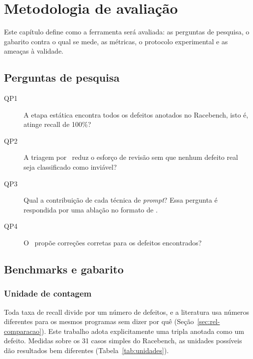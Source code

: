\chapter{Metodologia de avaliação}
\label{cap:metodologia}


Este capítulo define como a ferramenta será avaliada: as perguntas de pesquisa,
o gabarito contra o qual se mede, as métricas, o protocolo experimental e as
ameaças à validade.

\section{Perguntas de pesquisa}
\label{sec:qp}

\begin{description}
  \item[QP1] A etapa estática encontra todos os defeitos anotados no Racebench,
    isto é, atinge recall de 100\%?
  \item[QP2] A triagem por \llm\ reduz o esforço de revisão sem que nenhum
    defeito real seja classificado como inviável?
  \item[QP3] Qual a contribuição de cada técnica de \textit{prompt}? Essa pergunta
    é respondida por uma ablação no formato de .
  \item[QP4] O \llm\ propõe correções corretas para os defeitos encontrados?
\end{description}

\section{Benchmarks e gabarito}
\label{sec:benchmarks}

\subsection{Unidade de contagem}

Toda taxa de recall divide por um número de defeitos, e a literatura usa números
diferentes para os mesmos programas sem dizer por quê
(Seção~\ref{sec:rel-comparacao}). Este trabalho adota explicitamente
uma tripla anotada como um defeito. Medidas sobre os 31 casos simples
do Racebench, as unidades possíveis dão resultados bem diferentes
(Tabela~\ref{tab:unidades}).

